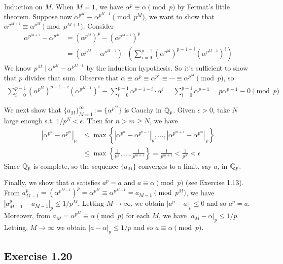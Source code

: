 \documentclass[../Koblitz.tex]{subfiles}
\begin{document}
Induction on $M$. When $M=1$, we have $\alpha^p\equiv\alpha\pmod{p}$ by Fermat's little theorem. Suppose now $\alpha^{p^M}\equiv\alpha^{p^{M-1}} \pmod{p^M}$, we want to show that $\alpha^{p^{M+1}}\equiv\alpha^{p^M} \pmod{p^{M+1}}$. Consider
\begin{align*}
    \alpha^{p^{M+1}}-\alpha^{p^M} &= \left(\alpha^{p^M}\right)^p - \left(\alpha^{p^{M-1}}\right)^p \\
    &= \left(\alpha^{p^M}-\alpha^{p^{M-1}}\right)\cdot \left(\sum_{i=0}^{p-1} \left(\alpha^{p^M}\right)^{p-1-i}\left(\alpha^{p^{M-1}}\right)^i\right)
\end{align*}
We know $p^M\mid\alpha^{p^M}-\alpha^{p^{M-1}}$ by the induction hypothesis. So it's sufficient to show that $p$ divides that sum. Observe that $\alpha\equiv\alpha^p\equiv\alpha^{p^2}\equiv\cdots\equiv\alpha^{p^M} \pmod{p}$, so
\begin{align*}
    \sum_{i=0}^{p-1} \left(\alpha^{p^M}\right)^{p-1-i}\left(\alpha^{p^{M-1}}\right)^i \equiv \sum_{i=0}^{p-1} \alpha^{p-1-i}\cdot\alpha^i = \sum_{i=0}^{p-1} \alpha^{p-1} = p\alpha^{p-1} \equiv 0 \pmod{p}
\end{align*}

We next show that $\{a_M\}_{M=1}^\infty:=\{\alpha^{p^M}\}$ is Cauchy in $\mathbb{Q}_p$. Given $\epsilon>0$, take $N$ large enough s.t. $1/p^N<\epsilon$. Then for $n>m\geq N$, we have
\begin{align*}
    \left|\alpha^{p^n}-\alpha^{p^m}\right|_p &\leq \max\left\{ \left|\alpha^{p^n}-\alpha^{p^{n-1}}\right|_p,\ldots,\left|\alpha^{p^{m+1}}-\alpha^{p^m}\right|_p \right\} \\
    &\leq \max \left\{ \frac{1}{p^n},\ldots,\frac{1}{p^{m+1}} \right\} = \frac{1}{p^{m+1}} < \frac{1}{p^N} <\epsilon
\end{align*}
Since $\mathbb{Q}_p$ is complete, so the sequence $\{a_M\}$ converges to a limit, say $a$, in $\mathbb{Q}_p$.

Finally, we show that $a$ satisfies $a^p=a$ and $a\equiv\alpha\pmod{p}$ (see Exercise 1.13). From $a_{M-1}^p = (\alpha^{p^{M-1}})^p= \alpha^{p^M} \equiv \alpha^{p^{M-1}} = a_{M-1} \pmod{p^M}$, we have $|a_{M-1}^p-a_{M-1}|_p\leq 1/p^M$. Letting $M\to\infty$, we obtain $|a^p-a|_p\leq 0$ and so $a^p=a$. Moreover, from $a_M = \alpha^{p^M} \equiv\alpha\pmod{p}$ for each $M$, we have $|a_M-\alpha|_p\leq 1/p$. Letting, $M\to\infty$ we obtain $|a-\alpha|_p\leq 1/p$ and so $a\equiv\alpha\pmod{p}$.

\subsection*{Exercise 1.20}
\end{document}
